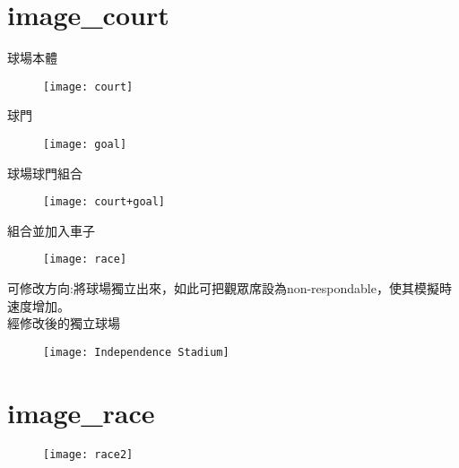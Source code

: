 \section{image\_court}
球場本體\\
\begin{figure}
\texttt{[image: court]}
\end{figure}
球門\\
\begin{figure}
\texttt{[image: goal]}
\end{figure}
球場球門組合\\
\begin{figure}
\texttt{[image: court+goal]}
\end{figure}
組合並加入車子\\
\begin{figure}
\texttt{[image: race]}
\end{figure}
可修改方向:將球場獨立出來，如此可把觀眾席設為non-respondable，使其模擬時速度增加。\\
經修改後的獨立球場\\
\begin{figure}
\texttt{[image: Independence Stadium]}
\end{figure}
\section{image\_race}
\begin{figure}
\texttt{[image: race2]}
\end{figure}


